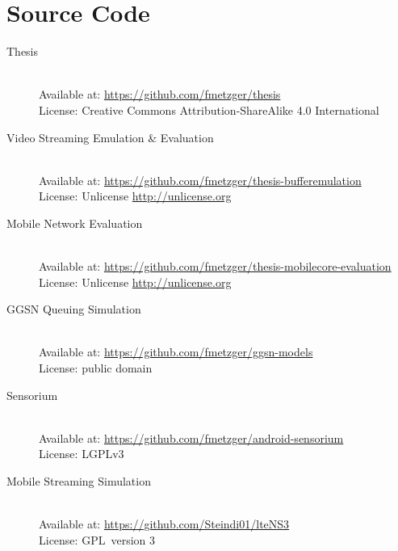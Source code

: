 \chapter*{Source Code}
%

\begin{description}
	\item[Thesis]\hfill \\
	Available at: \url{https://github.com/fmetzger/thesis} \\ %
	License: Creative Commons Attribution-ShareAlike 4.0 International \cite{ccbysa40}

	\item[Video Streaming Emulation \& Evaluation]\hfill \\
	Available at: \url{https://github.com/fmetzger/thesis-bufferemulation} \\
	License: Unlicense \url{http://unlicense.org}

	\item[Mobile Network Evaluation]\hfill \\
	Available at: \url{https://github.com/fmetzger/thesis-mobilecore-evaluation}  \\
	License: Unlicense \url{http://unlicense.org}

	\item[GGSN Queuing Simulation]\hfill \\
	Available at: \url{https://github.com/fmetzger/ggsn-models} \\
	License: public domain

	\item[Sensorium]\hfill \\
	Available at: \url{https://github.com/fmetzger/android-sensorium} \\
	License: \gls{LGPLv3}~\cite{lgplv3}

	\item[Mobile Streaming Simulation]\hfill \\
	Available at: \url{https://github.com/Steindi01/lteNS3} \\
	License: \gls{GPL}~version 3~\cite{gplv3}

\end{description}